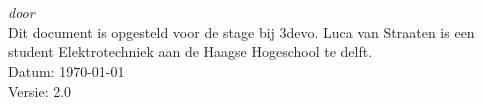 \begin{titlepage}
    \vspace*{5cm}
    \makeatletter
    \begin{center}
        \begin{Huge}
            \@title
        \end{Huge}\\[0.1cm]
        \begin{Large}
            \@subtitle
        \end{Large}\\
        \emph{door}\\
        \@author
        \vfill
        Dit document is opgesteld voor de stage bij 3devo. Luca van
        Straaten is een student Elektrotechniek aan de Haagse Hogeschool te
        delft.\\
        \vspace{.5cm}
        Datum: \today\\
        Versie: 2.0
    \end{center}
    \makeatother
\end{titlepage}

\newpage
